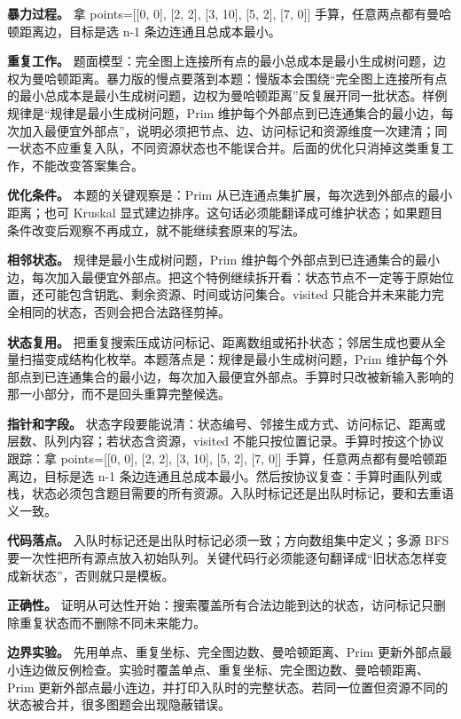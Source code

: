 \textbf{暴力过程。} 拿 points=[[0, 0], [2, 2], [3, 10], [5, 2], [7, 0]] 手算，任意两点都有曼哈顿距离边，目标是选 n-1 条边连通且总成本最小。

\textbf{重复工作。} 题面模型：完全图上连接所有点的最小总成本是最小生成树问题，边权为曼哈顿距离。暴力版的慢点要落到本题：慢版本会围绕“完全图上连接所有点的最小总成本是最小生成树问题，边权为曼哈顿距离”反复展开同一批状态。样例规律是“规律是最小生成树问题，Prim 维护每个外部点到已连通集合的最小边，每次加入最便宜外部点”，说明必须把节点、边、访问标记和资源维度一次建清；同一状态不应重复入队，不同资源状态也不能误合并。后面的优化只消掉这类重复工作，不能改变答案集合。

\textbf{优化条件。} 本题的关键观察是：Prim 从已连通点集扩展，每次选到外部点的最小距离；也可 Kruskal 显式建边排序。这句话必须能翻译成可维护状态；如果题目条件改变后观察不再成立，就不能继续套原来的写法。

\textbf{相邻状态。} 规律是最小生成树问题，Prim 维护每个外部点到已连通集合的最小边，每次加入最便宜外部点。把这个特例继续拆开看：状态节点不一定等于原始位置，还可能包含钥匙、剩余资源、时间或访问集合。visited 只能合并未来能力完全相同的状态，否则会把合法路径剪掉。

\textbf{状态复用。} 把重复搜索压成访问标记、距离数组或拓扑状态；邻居生成也要从全量扫描变成结构化枚举。本题落点是：规律是最小生成树问题，Prim 维护每个外部点到已连通集合的最小边，每次加入最便宜外部点。手算时只改被新输入影响的那一小部分，而不是回头重算完整候选。

\textbf{指针和字段。} 状态字段要能说清：状态编号、邻接生成方式、访问标记、距离或层数、队列内容；若状态含资源，visited 不能只按位置记录。手算时按这个协议跟踪：拿 points=[[0, 0], [2, 2], [3, 10], [5, 2], [7, 0]] 手算，任意两点都有曼哈顿距离边，目标是选 n-1 条边连通且总成本最小。然后按协议复查：手算时画队列或栈，状态必须包含题目需要的所有资源。入队时标记还是出队时标记，要和去重语义一致。

\textbf{代码落点。} 入队时标记还是出队时标记必须一致；方向数组集中定义；多源 BFS 要一次性把所有源点放入初始队列。关键代码行必须能逐句翻译成“旧状态怎样变成新状态”，否则就只是模板。

\textbf{正确性。} 证明从可达性开始：搜索覆盖所有合法边能到达的状态，访问标记只删除重复状态而不删除不同未来能力。

\textbf{边界实验。} 先用单点、重复坐标、完全图边数、曼哈顿距离、Prim 更新外部点最小连边做反例检查。实验时覆盖单点、重复坐标、完全图边数、曼哈顿距离、Prim 更新外部点最小连边，并打印入队时的完整状态。若同一位置但资源不同的状态被合并，很多图题会出现隐蔽错误。

